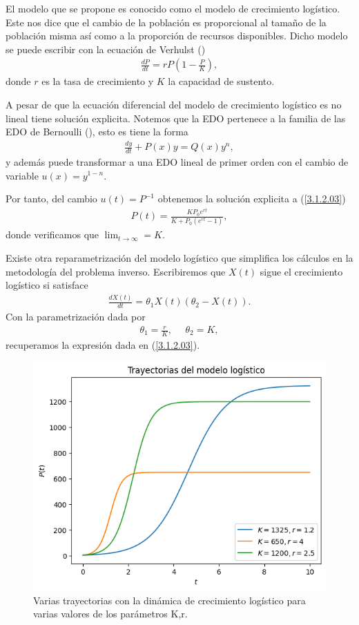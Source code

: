 El modelo que se propone es conocido como el modelo de crecimiento logístico. Este nos dice que el cambio de la población es proporcional al tamaño de la población misma así como a la proporción de recursos disponibles. Dicho modelo se puede escribir con la ecuación de Verhulst (\cite{zill2002ecuaciones}) 
\begin{align}
    \frac{dP}{dt} = rP\left(1- \frac{P}{K}  \right),
    \label{3.1.2.03}
\end{align}
donde $r$ es la tasa de crecimiento y $K$ la capacidad de sustento.

A pesar de que la ecuación diferencial del modelo de crecimiento logístico es no lineal tiene solución explicita. Notemos que la EDO pertenece a la familia de las EDO de Bernoulli (\cite{apostol1991calculus}), esto es tiene la forma
\begin{align*}
    \frac{dy}{dt} + P(x) y =Q(x) y^n,
\end{align*}
y además puede transformar a una EDO lineal de primer orden con el cambio de variable $u(x) = y ^{1-n}$.

Por tanto, del cambio $u(t) = P^{-1}$ obtenemos la solución explicita a (\ref{3.1.2.03})
\begin{align}
    P(t) = \frac{KP_0 e^{rt}}{K + P_0 \left(e^{rt}-1\right)},    
    \label{3.1.2.05}
\end{align}
donde verificamos que $\lim_{t \rightarrow \infty} = K $. 

Existe otra reparametrización del modelo logístico que simplifica los cálculos en la metodología del problema inverso. Escribiremos que $X(t)$ sigue el crecimiento logístico si satisface
\begin{align}
    \frac{dX(t)}{dt} = \theta_1 X(t)\left(\theta_2 - X(t)\right).
    \label{3.1.2.06}
\end{align}
Con la parametrización dada por
\begin{align*}
    \theta_1 = \frac{r}{K}, \:\:\:\:\:\: \theta_2 = K,
\end{align*}
recuperamos la expresión dada en (\ref{3.1.2.03}).


\begin{figure}
    \centering
    \includegraphics[width = 10 cm]{img/trayectoria_log.png}
    \caption{Varias trayectorias con la dinámica de crecimiento logístico para varias valores de los parámetros K,r.}
    \label{fig:trayectoria_logistico}
\end{figure}

